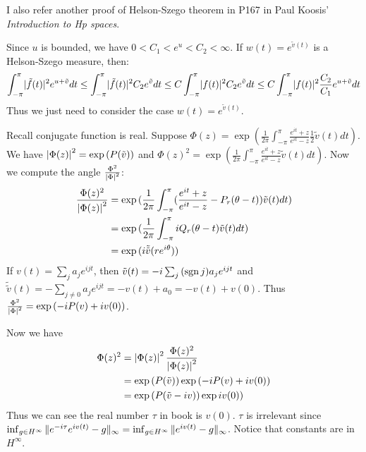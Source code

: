 \begin{remark}
    I also refer another proof of Helson-Szego theorem in P167 in Paul Koosis' \emph{Introduction to Hp spaces}.\par
    Since $u$ is bounded, we have $0<C_1<e^u<C_2<\infty$. If $w(t)=e^{\tilde{v}(t)}$ is a Helson-Szego measure, then:
    \begin{equation*}
        \int_{-\pi}^{\pi}\lvert\tilde{f}(t)\rvert^2e^{u+\tilde{v}}d t\leq \int_{-\pi}^{\pi}\lvert\tilde{f}(t)\rvert^2C_2e^{\tilde{v}}d t\leq C\int_{-\pi}^{\pi}\lvert{f}(t)\rvert^2C_2e^{\tilde{v}}d t\leq C\int_{-\pi}^{\pi}\lvert{f}(t)\rvert^2\frac{C_2}{C_1}e^{u+\tilde{v}}d t
    \end{equation*}
    Thus we just need to consider the case $w(t)=e^{\tilde{v}(t)}$.\par
    Recall conjugate function is real. Suppose $\Phi(z)=\exp{(\frac{1}{2\pi}\int_{-\pi}^{\pi}\frac{e^{it}+z}{e^{it}-z}\frac{1}{2}\tilde{v}(t)dt)}$.
    We have  $\left\lvert\Phi(z)\right\rvert^2=\exp{(P(\tilde{v}))}$ and $\Phi(z)^2=\exp{(\frac{1}{2\pi}\int_{-\pi}^{\pi}\frac{e^{it}+z}{e^{it}-z}\tilde{v}(t)dt)}$. Now we compute the angle $\frac{\Phi^2}{\left\lvert\Phi\right\rvert^2}$:
    \begin{align*}
        \frac{\Phi(z)^2}{\left\lvert\Phi(z)\right\rvert^2} & =\exp{(\frac{1}{2\pi}\int_{-\pi}^{\pi}(\frac{e^{it}+z}{e^{it}-z}-P_r(\theta-t))\tilde{v}(t)d t)} \\
                                          & =\exp{(\frac{1}{2\pi}\int_{-\pi}^{\pi}iQ_r(\theta-t)\tilde{v}(t)d t)}                            \\
                                          & =\exp{(i\tilde{\tilde{v}}(re^{i\theta}))}                                                        \\
    \end{align*}
    If $v(t)=\sum_{j}{a_je^{ijt}}$, then $\tilde{v}(t)=-i\sum_{j}{(\operatorname{sgn} j)a_je^{ijt}}$ and $\tilde{\tilde{v}}(t)=-\sum_{j\neq 0}{a_je^{ijt}}=-v(t)+a_0=-v(t)+v(0)$. Thus $\frac{\Phi^2}{\left\lvert\Phi\right\rvert^2}=\exp{(-iP(v)+iv(0))}$.\par
    Now we have
    \begin{align*}
        \Phi(z)^2 & =\left\lvert\Phi(z)\right\rvert^2\frac{\Phi(z)^2}{\left\lvert\Phi(z)\right\rvert^2} \\
                  & =\exp{(P(\tilde{v}))}\exp{(-iP(v)+iv(0))}         \\
                  & =\exp{(P(\tilde{v}-iv))}\exp{iv(0))}
    \end{align*}
    Thus we can see the real number $\tau$ in book is $v(0)$. $\tau$ is irrelevant since $\inf_{g\in H^\infty}{\lVert e^{-i\tau}e^{iv(t)}-g\rVert_\infty}=\inf_{g\in H^\infty}{\lVert e^{iv(t)}-g\rVert_\infty}$. Notice that constants are in $H^\infty$.

\end{remark}
